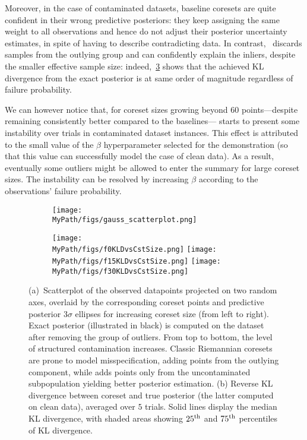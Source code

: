 Moreover, in the case of contaminated datasets, baseline coresets are quite confident in their wrong predictive posteriors: they keep assigning the same weight to all observations and hence do not adjust their posterior uncertainty estimates, in spite of having to describe contradicting data. In contrast,~\bcores{} discards samples from the outlying group and can confidently explain the inliers, despite the smaller effective sample size: indeed,~\cref{fig:gauss_kld} shows that the achieved KL divergence from the exact posterior is at same order of magnitude regardless of failure probability. 

We can however notice that, for coreset sizes growing beyond 60 points---despite remaining consistently better compared to the baselines---\bcores{} starts to present some instability over trials in contaminated dataset instances. This effect is attributed to the small value of the $\beta$ hyperparameter  selected for the demonstration (so that this value can successfully model the case of clean data). As a result, eventually some outliers might be allowed to enter the summary for large coreset sizes. The instability can be resolved by increasing $\beta$ according to the observations' failure probability. 

\begin{figure}[!htp]
	\centering 
	\begin{subfigure}[ht]{0.96\textwidth} 
		\texttt{[image: \\MyPath/figs/gauss\_scatterplot.png]}
		\caption{\label{fig:beta_gaussian_coreset_points}}
	\end{subfigure}
	\hfill\qquad
	\begin{subfigure}[ht]{0.96\textwidth} 
		\centering
		\texttt{[image: \\MyPath/figs/f0KLDvsCstSize.png]}
		\centering
		\hfill
		\texttt{[image: \\MyPath/figs/f15KLDvsCstSize.png]}
		\centering
		\hfill
		\texttt{[image: \\MyPath/figs/f30KLDvsCstSize.png]}
		\caption{\label{fig:gauss_kld}}
	\end{subfigure}	
	\centering
	\caption{(a)~Scatterplot of the observed datapoints projected on two random axes, overlaid by the corresponding coreset points and predictive posterior $3\sigma$ ellipses for increasing coreset size (from left to right). Exact posterior (illustrated in black) is computed on the dataset after removing the group of outliers. From top to bottom, the level of structured contamination increases. Classic Riemannian coresets are prone to model misspecification, adding points from the outlying component, while \bcores{} adds points only from the uncontaminated subpopulation yielding better posterior estimation. (b) Reverse KL divergence between coreset and true posterior (the latter computed on clean data), averaged over $5$ trials. Solid lines display the median KL divergence, with shaded areas showing $25\textsuperscript{th}$ and $75\textsuperscript{th}$ percentiles of KL divergence.}
\end{figure}


